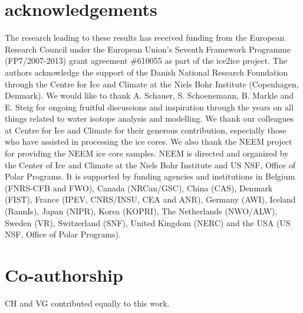 \documentclass[11pt, draftcls, onecolumn]{IEEEtran} %
\numberwithin{equation}{section}
\numberwithin{table}{section}
\numberwithin{figure}{section}
\begin{document}
\section*{acknowledgements}
The research leading to these results has received funding from the European Research Council under the
European Union's Seventh Framework Programme (FP7/2007-2013) grant agreement \#610055 as part
of the ice2ice project.
The authors acknowledge the support of the Danish National Research Foundation through
the Centre for Ice and Climate at the Niels Bohr Institute (Copenhagen, Denmark).
We would like to thank A. Schauer, S. Schoenemann, B. Markle and E. Steig for ongoing fruitful discussions 
and inspiration through the years on all things related to water isotope analysis and modelling.
We thank our colleagues at Centre for Ice and Climate for their generous contribution,
especially those who have assisted in processing the ice cores.
We also thank the NEEM project for providing the NEEM ice core samples. 
NEEM is directed and organized by the Center of Ice and Climate at the Niels Bohr Institute and US
NSF, Office of Polar Programs. 
It is supported by funding agencies and institutions in Belgium (FNRS-CFB and
FWO), Canada (NRCan/GSC), China (CAS), Denmark (FIST), France (IPEV, CNRS/INSU, CEA and ANR),
Germany (AWI), Iceland (RannIs), Japan (NIPR), Korea (KOPRI), The Netherlands (NWO/ALW), Sweden (VR),
Switzerland (SNF), United Kingdom (NERC) and the USA (US NSF, Office of Polar Programs).

\section*{Co-authorship}
CH and VG contributed equally to this work.
\end{document}
